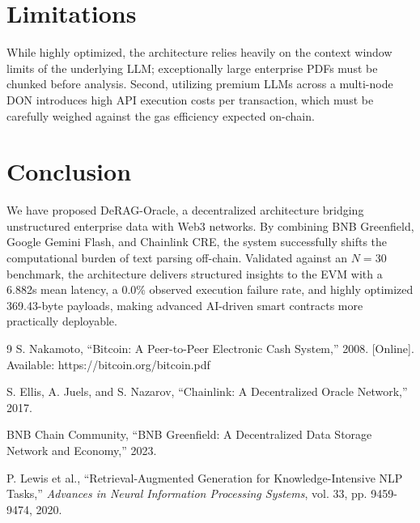 \documentclass[11pt,a4paper]{article}
\begin{document}
\section{Limitations}
While highly optimized, the architecture relies heavily on the context window limits of the underlying LLM; exceptionally large enterprise PDFs must be chunked before analysis. Second, utilizing premium LLMs across a multi-node DON introduces high API execution costs per transaction, which must be carefully weighed against the gas efficiency expected on-chain.

\section{Conclusion}
We have proposed DeRAG-Oracle, a decentralized architecture bridging unstructured enterprise data with Web3 networks. By combining BNB Greenfield, Google Gemini Flash, and Chainlink CRE, the system successfully shifts the computational burden of text parsing off-chain. Validated against an $N=30$ benchmark, the architecture delivers structured insights to the EVM with a 6.882s mean latency, a 0.0\% observed execution failure rate, and highly optimized 369.43-byte payloads, making advanced AI-driven smart contracts more practically deployable.

\begin{thebibliography}{9}
S. Nakamoto, ``Bitcoin: A Peer-to-Peer Electronic Cash System,'' 2008. [Online]. Available: https://bitcoin.org/bitcoin.pdf

S. Ellis, A. Juels, and S. Nazarov, ``Chainlink: A Decentralized Oracle Network,'' 2017.

BNB Chain Community, ``BNB Greenfield: A Decentralized Data Storage Network and Economy,'' 2023.

P. Lewis et al., ``Retrieval-Augmented Generation for Knowledge-Intensive NLP Tasks,'' \textit{Advances in Neural Information Processing Systems}, vol. 33, pp. 9459-9474, 2020.
\end{thebibliography}
\end{document}
